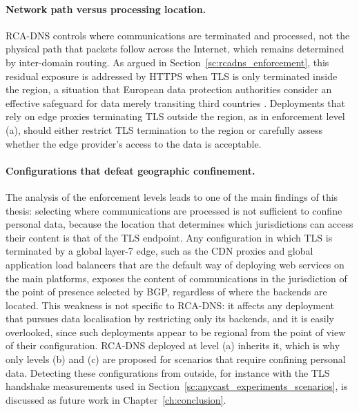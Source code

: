 \paragraph{Network path versus processing location.} RCA-DNS controls where communications are terminated and processed, not the physical path that packets follow across the Internet, which remains determined by inter-domain routing. As argued in Section~\ref{sc:rcadns_enforcement}, this residual exposure is addressed by HTTPS when TLS is only terminated inside the region, a situation that European data protection authorities consider an effective safeguard for data merely transiting third countries \cite{RecommendationsBoard}. Deployments that rely on edge proxies terminating TLS outside the region, as in enforcement level (a), should either restrict TLS termination to the region or carefully assess whether the edge provider's access to the data is acceptable. 

\paragraph{Configurations that defeat geographic confinement.} The analysis of the enforcement levels leads to one of the main findings of this thesis: selecting where communications are processed is not sufficient to confine personal data, because the location that determines which jurisdictions can access their content is that of the TLS endpoint. Any configuration in which TLS is terminated by a global layer-7 edge, such as the CDN proxies and global application load balancers that are the default way of deploying web services on the main platforms, exposes the content of communications in the jurisdiction of the point of presence selected by BGP, regardless of where the backends are located. This weakness is not specific to RCA-DNS: it affects any deployment that pursues data localisation by restricting only its backends, and it is easily overlooked, since such deployments appear to be regional from the point of view of their configuration. RCA-DNS deployed at level (a) inherits it, which is why only levels (b) and (c) are proposed for scenarios that require confining personal data. Detecting these configurations from outside, for instance with the TLS handshake measurements used in Section~\ref{sc:anycast_experiments_scenarios}, is discussed as future work in Chapter~\ref{ch:conclusion}.


